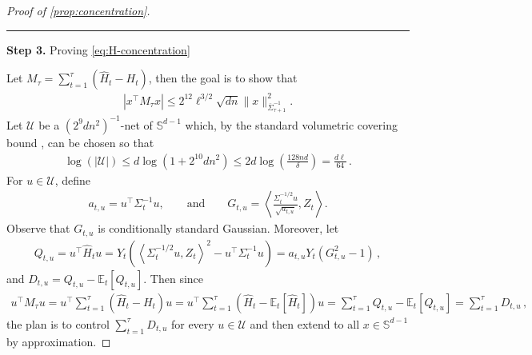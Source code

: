 \documentclass[11pt]{article}
\newcommand{\proofstep}[2]{%
    \par\medskip
    \noindent
    \textcolor{blue!55!black}{\rule{2pt}{1.2em}}%
    \hspace{0.6em}%
    {\sffamily\bfseries\color{blue!55!black}Step #1}%
    \quad
    {\sffamily #2}%
    \par\smallskip
}
\newcommand{\E}{\mathbb E}
\newcommand{\1}{\mathbf 1}
\newcommand{\ip}[2]{\left\langle #1,#2\right\rangle}
\begin{document}
\begin{proof}[Proof of \cref{prop:concentration}]
    \proofstep{3.}{Proving \eqref{eq:H-concentration}}
    Let $M_\tau= \sum_{t=1}^{\tau}(\widehat H_t-H_t)$, then the goal is to show that
    \begin{align}
        |x^\top M_\tau x|
        \leq
        2^{12}\ell^{3/2}\sqrt{dn} \|x\|^2_{\overline\Sigma_{\tau+1}^{-1}}.
    \end{align}
    Let $\mathcal U$ be a $\left(2^9dn^2\right)^{-1}$-net of
    $\mathbb S^{d-1}$ which, by the standard volumetric covering bound
    \cite[Corollary~4.2.13]{vershynin2018high}, can be chosen so that
    \begin{align}
        \log\left(|\mathcal U|\right)
        \leq
        d\log\left(1+2^{10}dn^2\right)
        \leq
        2d\log\left(
        \frac{128nd}{\delta}
        \right)
        =\frac{d\ell}{64}\,.
    \end{align}
    For $u\in\mathcal U$, define
    \begin{align}
        a_{t,u}
        =
        u^\top\Sigma_t^{-1}u,
        \qquad\text{and}\qquad
        G_{t,u}
        =
        \ip{
            \frac{
                \Sigma_t^{-1/2}u
            }{\sqrt{a_{t,u}}}
        }{Z_t}.
        \label{eq:H-standardisation}
    \end{align}
    Observe that $G_{t,u}$ is conditionally standard Gaussian.
    Moreover, let
    \begin{align}
        Q_{t,u} =
        u^\top\widehat H_tu
        =
        Y_t\left(
        \ip{\Sigma_t^{-1/2}u}{Z_t}^2
        -
        u^\top\Sigma_t^{-1}u
        \right)
        =
        a_{t,u}Y_t(G_{t,u}^2-1)\,,
        \label{eq:H-direction}
    \end{align}
    and $D_{t,u}=Q_{t,u}-\E_t[Q_{t,u}]$.
    Then since
    \begin{align}
        u^\top M_\tau u
        =
        u^\top\sum_{t=1}^{\tau}(\widehat H_t-H_t)u
        =
        u^\top\sum_{t=1}^{\tau}(\widehat H_t-\E_t[\widehat H_t])u
        =
        \sum_{t=1}^{\tau} Q_{t,u} - \E_t[Q_{t,u}]
        =
        \sum_{t=1}^{\tau} D_{t,u}
        \,,
    \end{align}
    the plan is to control $\sum_{t=1}^{\tau} D_{t,u}$ for every $u\in\mathcal U$ and then extend to all $x\in\mathbb{S}^{d-1}$ by approximation.


\end{proof}
\end{document}
